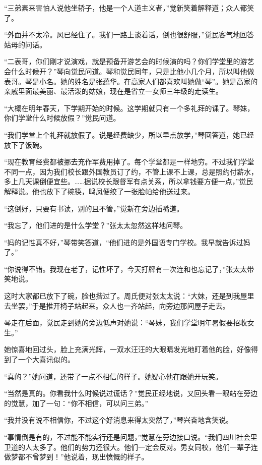 \par “三弟素来害怕人说他坐轿子，他是一个人道主义者，”觉新笑着解释道；众人都笑了。
\par “外面并不太冷。风已经住了。我们一路上谈着话，倒也很舒服，”觉民客气地回答姑母的问话。
\par “二表哥，你们刚才说演戏，就是预备开游艺会的时候演的吗？你们学堂里的游艺会什么时候开？”琴向觉民问道。琴和觉民同年，只是比他小几个月，所以叫他做表哥。琴是小名。她的姓名是张蕴华。在高家人们都喜欢叫她做“琴”。她是高家的亲戚里面最美丽、最活泼的姑娘，现在是省立一女师三年级的走读生。
\par “大概在明年春天，下学期开始的时候。这学期就只有一个多礼拜的课了。琴妹，你们学堂什么时候放假？”觉民问道。
\par “我们学堂上个礼拜就放假了。说是经费缺少，所以早点放学，”琴回答道，她已经放下了饭碗。
\par “现在教育经费都被挪去充作军费用掉了。每个学堂都是一样地穷。不过我们学堂不同一点，因为我们校长跟外国教员订了约，不管上课不上课，总是照约付薪水，多上几天课倒便宜些。……据说校长跟督军有点关系，所以拿钱要方便一点，”觉民解释说。他也放下了碗筷，鸣凤便绞了一张脸帕给他送过来。
\par “这倒好，只要有书读，别的且不管，”觉新在旁边插嘴道。
\par “我忘了，他们进的是什么学堂？”张太太忽然这样地问琴。
\par “妈的记性真不好，”琴带笑答道，“他们进的是外国语专门学校。我早就告诉过妈了。”
\par “你说得不错。我现在老了，记性坏了，今天打牌有一次连和也忘记了，”张太太带笑地说。
\par 这时大家都已放下了碗，脸也揩过了。周氏便对张太太说：“大妹，还是到我屋里去坐罢，”于是推开椅子站起来。众人也一齐站起，向旁边那间屋子走去。
\par 琴走在后面，觉民走到她的旁边低声对她说：“琴妹，我们学堂明年暑假要招收女生。”
\par 她惊喜地回过头，脸上充满光辉，一双水汪汪的大眼睛发光地盯着他的脸，好像得到了一个大喜讯似的。
\par “真的？”她问道，还带了一点不相信的样子。她疑心他在跟她开玩笑。
\par “当然是真的。你看我什么时候说过谎话？”觉民正经地说，又回头看一眼站在旁边的觉慧，加了一句：“你不相信，可以问三弟。”
\par “我并没有说不相信你，不过这个好消息来得太突然了，”琴兴奋地含笑说。
\par “事情倒是有的，不过能不能实行还是问题，”觉慧在旁边接口说。“我们四川社会里卫道的人太多了。他们的势力还很大。他们一定会反对。男女同校，他们一辈子连做梦都不曾梦到！”他说着，现出愤慨的样子。
